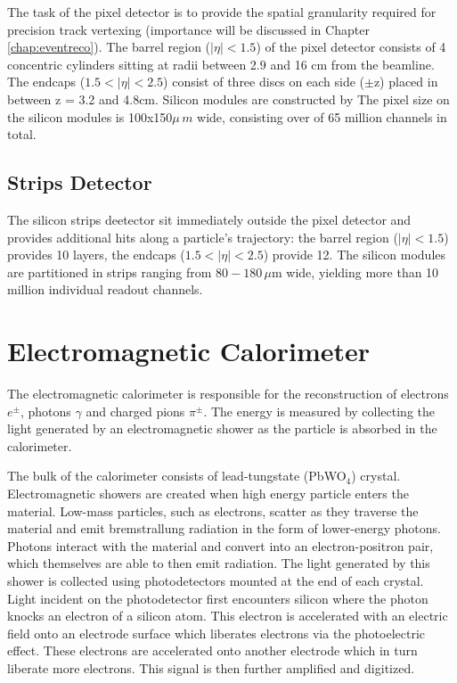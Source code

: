 The task of the pixel detector is to provide the spatial granularity required for precision track vertexing (importance will be discussed in Chapter \ref{chap:eventreco}). The barrel region ($|\eta|<1.5$) of the pixel detector consists of 4 concentric cylinders sitting at radii between 2.9 and 16 cm from the beamline. The endcaps ($1.5<|\eta|<2.5$) consist of three discs on each side ($\pm$z) placed in between z = 3.2 and 4.8cm. Silicon modules are constructed by The pixel size on the silicon modules is 100x150$\mu\,m$ wide, consisting over of 65 million channels in total.

\subsection{Strips Detector}

The silicon strips deetector sit immediately outside the pixel detector and provides additional hits along a particle's trajectory: the barrel region ($|\eta|<1.5$) provides 10 layers, the endcaps ($1.5<|\eta|<2.5$) provide 12. The silicon modules are partitioned in strips ranging from $80-180\,\mu$m wide, yielding more than 10 million individual readout channels.

\section{Electromagnetic Calorimeter}

The electromagnetic calorimeter is responsible for the reconstruction of electrons $e^{\pm}$, photons $\gamma$ and charged pions $\pi^{\pm}$. The energy is measured by collecting the light generated by an electromagnetic shower as the particle is absorbed in the calorimeter.\cite{ecaltdr}\cite{ecaltdradd}

The bulk of the calorimeter consists of lead-tungstate (PbWO$_{4}$) crystal. Electromagnetic showers are created when high energy particle enters the material. Low-mass particles, such as electrons, scatter as they traverse the material and emit bremstrallung radiation in the form of lower-energy photons. Photons interact with the material and convert into an electron-positron pair, which themselves are able to then emit radiation. The light generated by this shower is collected using photodetectors mounted at the end of each crystal. Light incident on the photodetector first encounters silicon where the photon knocks an electron of a silicon atom. This electron is accelerated with an electric field onto an electrode surface which liberates electrons via the photoelectric effect. These electrons are accelerated onto another electrode which in turn liberate more electrons. This signal is then further amplified and digitized.

